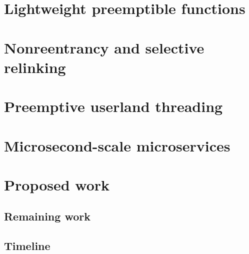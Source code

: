 \documentclass[12pt,letterpaper,openright]{report}
\makeatletter
\newcommand{\includegraphicsdir}{}
\let\@input
\renewcommand{}[2][]{
	\renewcommand{\includegraphicsdir}{#1/}
	\@input{#1/#2}
	\renewcommand{\includegraphicsdir}{}
}
\makeatother
\begin{document}




\chapter{Lightweight preemptible functions}






\chapter{Nonreentrancy and selective relinking}




\chapter{Preemptive userland threading}





\chapter{Microsecond-scale microservices}









\chapter{Proposed work}

\section{Remaining work}
\section{Timeline}
\end{document}

